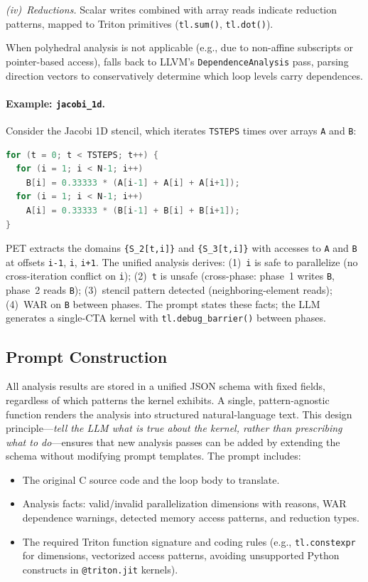 \emph{(iv)~Reductions.}
Scalar writes combined with array reads indicate reduction patterns, mapped to Triton primitives (\texttt{tl.sum()}, \texttt{tl.dot()}).

When polyhedral analysis is not applicable (e.g., due to non-affine subscripts or pointer-based access), \sysname falls back to LLVM's \texttt{DependenceAnalysis} pass, parsing direction vectors to conservatively determine which loop levels carry dependences.

\paragraph{Example: \texttt{jacobi\_1d}.}
Consider the Jacobi 1D stencil, which iterates \texttt{TSTEPS} times over arrays \texttt{A} and \texttt{B}:
\begin{lstlisting}[language=C,basicstyle=\ttfamily\tiny]
for (t = 0; t < TSTEPS; t++) {
  for (i = 1; i < N-1; i++)
    B[i] = 0.33333 * (A[i-1] + A[i] + A[i+1]);
  for (i = 1; i < N-1; i++)
    A[i] = 0.33333 * (B[i-1] + B[i] + B[i+1]);
}
\end{lstlisting}
PET extracts the domains \texttt{\{S\_2[t,i]\}} and \texttt{\{S\_3[t,i]\}} with accesses to \texttt{A} and \texttt{B} at offsets \texttt{i-1}, \texttt{i}, \texttt{i+1}.
The unified analysis derives:
(1)~\texttt{i} is safe to parallelize (no cross-iteration conflict on \texttt{i});
(2)~\texttt{t} is unsafe (cross-phase: phase~1 writes \texttt{B}, phase~2 reads \texttt{B});
(3)~stencil pattern detected (neighboring-element reads);
(4)~WAR on \texttt{B} between phases.
The prompt states these facts; the LLM generates a single-CTA kernel with \texttt{tl.debug\_barrier()} between phases.

\subsection{Prompt Construction}
All analysis results are stored in a unified JSON schema with fixed fields, regardless of which patterns the kernel exhibits. A single, pattern-agnostic function renders the analysis into structured natural-language text. This design principle---\emph{tell the LLM what is true about the kernel, rather than prescribing what to do}---ensures that new analysis passes can be added by extending the schema without modifying prompt templates. The prompt includes:
\begin{itemize}
\item The original C source code and the loop body to translate.
\item Analysis facts: valid/invalid parallelization dimensions with reasons, WAR dependence warnings, detected memory access patterns, and reduction types.
\item The required Triton function signature and coding rules (e.g., \texttt{tl.constexpr} for dimensions, vectorized access patterns, avoiding unsupported Python constructs in \texttt{@triton.jit} kernels).
\end{itemize}

